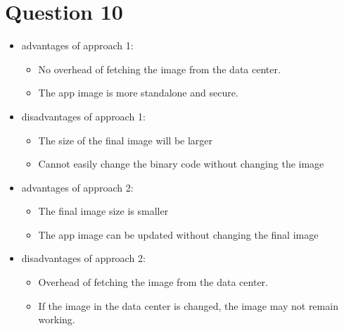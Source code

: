 \documentclass{article}
\begin{document}
\section{Question 10}
\begin{itemize}
    \item advantages of approach 1: 
        \begin{itemize}
        \item No overhead of fetching the image from the data center.
        \item The app image is more standalone and secure.
        \end{itemize}
    \item disadvantages of approach 1:
        \begin{itemize}
        \item The size of the final image will be larger
        \item Cannot easily change the binary code without changing the image
        \end{itemize}
    \item advantages of approach 2:
        \begin{itemize}
        \item The final image size is smaller
        \item The app image can be updated without changing the final image
        \end{itemize}
    \item disadvantages of approach 2:
        \begin{itemize}
        \item Overhead of fetching the image from the data center.
        \item If the image in the data center is changed, the image may not remain working.
        \end{itemize}
\end{itemize}
\end{document}
